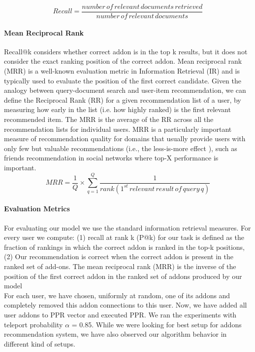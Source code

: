 \documentclass[11pt,oneside]{book}
\begin{document}
\begin{displaymath}
 Recall = \frac{number \, of \, relevant \, documents \, retrieved}{number \, of \, relevant \, documents}
\end{displaymath}

\paragraph{Mean Reciprocal Rank}
Recall@k considers whether correct addon is in the top
k results, but it does not consider the exact ranking position
of the correct addon. Mean reciprocal rank (MRR) \citep{voorhees1999trec} is a well-known evaluation metric in Information
Retrieval (IR) and is typically used to evaluate the position of the first correct candidate. Given the analogy between query-document
search and user-item recommendation, we can define the Reciprocal Rank (RR) for a given recommendation
list of a user, by measuring how early in the list (i.e. how highly ranked) is the first relevant recommended item. The MRR is the average of the RR across all the recommendation lists for individual users. MRR is a particularly important measure of recommendation quality for domains that usually provide users with only few but valuable recommendations
(i.e., the less-is-more effect \citep{chen2006less}), such as friends recommendation in social networks where top-X performance is important.
\begin{displaymath}
 MRR = \frac{1}{Q} \times \displaystyle\sum\limits_{q=1}^{Q} \frac{1}{rank(1^{st} \, relevant \, result \, of \, query \, q)}
\end{displaymath}

\paragraph{Evaluation Metrics}
For evaluating our model we use the standard information retrieval measures. For every user
we compute: (1) recall at rank k (P@k) for our task is
defined as the fraction of rankings in which the correct addon is ranked in the top-k positions, (2) Our recommendation is correct when the correct addon is present in
the ranked set of add-ons. The mean reciprocal rank (MRR)
is the inverse of the position of the first correct addon in the
ranked set of addons produced by our model\\
For each user, we have chosen, uniformly at random, one of its addons and completely removed this addon connections to this user. Now, we have added all user addons to PPR vector and executed PPR.
We ran the experiments with teleport probability $\alpha$ = 0.85.
While we were looking for best setup for addons recommendation system, we have also observed our algorithm behavior in different kind of setups.

\end{document}
